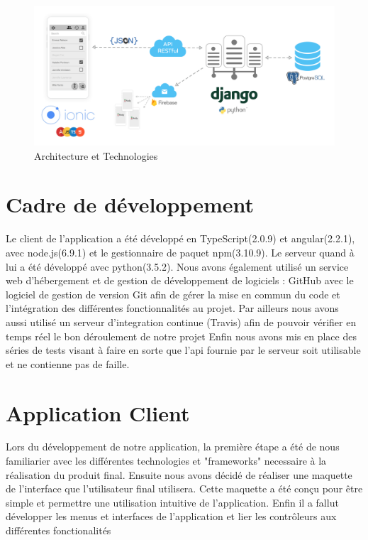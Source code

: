 \documentclass[french]{article}
\begin{document}
		\begin{figure}[H]
			\centering
			\includegraphics[scale=0.35]{../schema/schema-techno.png}
			\caption{Architecture et Technologies}
			\label{Architecture et Technologies}
		\end{figure}
		
	
	\section{Cadre de développement} 
		Le client de l'application a été développé en TypeScript(2.0.9) et angular(2.2.1), avec node.js(6.9.1) et le gestionnaire de paquet npm(3.10.9). Le serveur quand à lui a été développé avec python(3.5.2). 
		Nous avons également utilisé un service web d'hébergement et de gestion de développement de logiciels : GitHub avec le logiciel de gestion de version Git afin de gérer la mise en commun du code et l'intégration des différentes fonctionnalités au projet.
		Par ailleurs nous avons aussi utilisé un serveur d'integration continue (Travis) afin de pouvoir vérifier en temps réel le bon déroulement de notre projet
		Enfin nous avons mis en place des séries de tests visant à faire en sorte que l'api fournie par le serveur soit utilisable et ne contienne pas de faille.
			
	\section{Application Client}
	
	Lors du développement de notre application, la première étape a été de nous familiarier avec les différentes technologies et "frameworks" necessaire à la réalisation du produit final. Ensuite nous avons décidé de réaliser une maquette de l'interface que l'utilisateur final utilisera. Cette maquette a été conçu pour être simple et permettre une utilisation intuitive de l'application. Enfin il a fallut développer les menus et interfaces de l'application et lier les contrôleurs aux différentes fonctionalités
	
\end{document}
